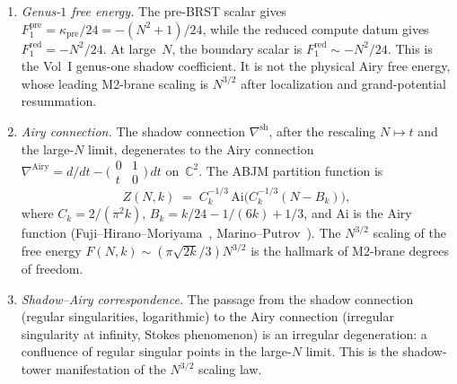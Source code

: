 \begin{theorem}
\begin{enumerate}[label=\textup{(\roman*)}]
\item \emph{Genus-$1$ free energy.}
 The pre-BRST scalar gives
 $F_1^{\mathrm{pre}} = \kappa_{\mathrm{pre}}/24 = -(N^2+1)/24$,
 while the reduced compute datum gives
 $F_1^{\mathrm{red}}=-N^2/24$.
 At large~$N$, the boundary scalar is
 $F_1^{\mathrm{red}}\sim -N^2/24$. This is the Vol~I genus-one
 shadow coefficient. It is not the physical Airy free energy, whose
 leading M2-brane scaling is $N^{3/2}$ after localization and
 grand-potential resummation.

\item \emph{Airy connection.}
 The shadow connection $\nabla^{\mathrm{sh}}$,
 after the rescaling $N \mapsto t$ and the large-$N$ limit,
 degenerates to the Airy connection
 $\nabla^{\mathrm{Airy}} = d/dt - \bigl(\begin{smallmatrix}
 0 & 1 \\ t & 0 \end{smallmatrix}\bigr)\,dt$
 on~$\mathbb{C}^2$.
 The ABJM partition function is
 \begin{equation}\label{eq:frontier-abjm-airy}
 Z(N, k)
 \;=\;
 C_k^{-1/3}\,
 \mathrm{Ai}\bigl(
 C_k^{-1/3}(N - B_k)
 \bigr),
 \end{equation}
 where $C_k = 2/(\pi^2 k)$,
 $B_k = k/24 - 1/(6k) + 1/3$,
 and $\mathrm{Ai}$ is the Airy function
 \textup{(}Fuji--Hirano--Moriyama~\cite{FHM11},
 Marino--Putrov~\cite{MP11}\textup{)}.
 The $N^{3/2}$ scaling of the free energy
 $F(N, k) \sim (\pi\sqrt{2k}/3)N^{3/2}$
 is the hallmark of M2-brane degrees of freedom.

\item \emph{Shadow--Airy correspondence.}
 The passage from the shadow connection
 (regular singularities, logarithmic) to the Airy
 connection (irregular singularity at infinity,
 Stokes phenomenon) is an irregular degeneration:
 a confluence of regular singular points in the
 large-$N$ limit. This is the shadow-tower
 manifestation of the $N^{3/2}$ scaling law.
\end{enumerate}
\end{theorem}


